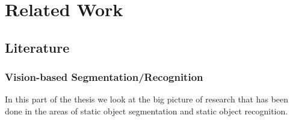 \chapter{Related Work}
\label{chapter:Related Work}


\section{Literature}
\subsection{Vision-based Segmentation/Recognition}














In this part of the thesis we look at the big picture of research that has been done in the areas of static object segmentation and static object recognition. 

